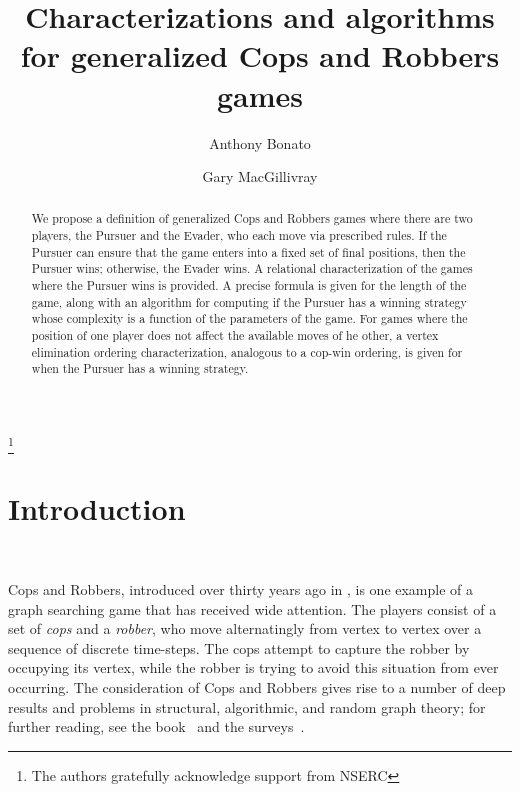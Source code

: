 \documentclass[12pt,reqno]{amsart}
\begin{document}
\title[Generalized Cops and Robbers games]{Characterizations and algorithms for generalized Cops and Robbers games}

\author{Anthony Bonato}
\address{Department of Mathematics, Ryerson University, Toronto, ON, Canada}
\author{Gary MacGillivray}
\address{Department of Mathematics and Statistics, University of Victoria, Victoria, BC, Canada}


 
\thanks{The authors gratefully acknowledge support from NSERC}

\begin{abstract}
We propose a definition of generalized Cops and Robbers games where there are two players, the Pursuer and the Evader, who each move via prescribed rules. If the Pursuer can ensure that the game
enters into a fixed set of final positions, then the Pursuer wins; otherwise, the Evader wins. A relational characterization of the games where the Pursuer wins is provided. A precise formula is
given for the length of the game, along with an algorithm for computing if the Pursuer has a winning strategy whose complexity is a function of the parameters of the game. For games where the
position of one player does not affect the available moves of he other, a vertex elimination ordering characterization, analogous to a cop-win ordering, is given for when the Pursuer has a winning
strategy.
\end{abstract}

\maketitle

\section{Introduction}~\label{introduction}

Cops and Robbers, introduced over thirty years ago in \cite{AF,Q1,Q2}, is one example of a graph searching game that has received wide attention. The players consist of a set of \emph{cops} and a
\emph{robber}, who move alternatingly from vertex to vertex over a sequence of discrete time-steps. The cops attempt to capture the robber by occupying its vertex, while the robber is trying to avoid
this situation from ever occurring. The consideration of Cops and Robbers gives rise to a number of deep results and problems in structural, algorithmic, and random graph theory; for further reading,
see the book~\cite{bonatorjn} and the surveys~\cite{bonato1,bonato2,bonato3}.
\end{document}
